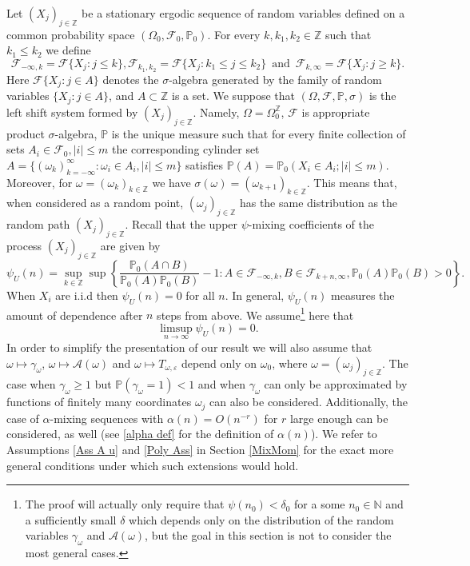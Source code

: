 \documentclass[11pt,reqno,a4paper]{article}
\theoremstyle{special}
\def\om{\omega}
\begin{document}
Let $(X_j)_{j\in\mathbb Z}$ be a stationary ergodic sequence of random variables defined on a common probability space $(\Omega_0,\mathcal F_0,\mathbb P_0)$. For every $k,k_1,k_2\in\mathbb Z$ such that $k_1\leq k_2$ we define 
$$
\mathcal F_{-\infty,k}=\mathcal F\{X_j: j\leq k\},
\mathcal F_{k_1,k_2}=\mathcal F\{X_j:  k_1\leq j\leq k_2\}\,\text{ and }\, 
\mathcal F_{k,\infty}=\mathcal F\{X_j: j\geq k\}.
$$
Here $\mathcal F\{X_j: j\in A\}$ denotes the $\sigma$-algebra generated by the family of random variables $\{X_j: j\in A\}$, and $A\subset\mathbb Z$ is a set.
We suppose that $(\Omega,\mathcal F,\mathbb P,\sigma)$ is the left shift system formed by   $(X_j)_{j\in\mathbb Z}$. Namely, $\Omega=\Omega_0^\mathbb Z$, $\mathcal F$ is appropriate product $\sigma$-algebra, $\mathbb P$ is the unique measure such that for every finite collection of sets $A_i\in \mathcal F_0, |i|\leq m$ the  corresponding cylinder set
$A=\{(\om_k)_{k=-\infty}^\infty: \om_i\in A_i, |i|\leq m\}$  satisfies $\mathbb P(A)=\mathbb P_0(X_i\in A_i; |i|\leq m)$. Moreover, for $\om=(\om_k)_{k\in\mathbb Z}$ we have  $\sigma(\om)=(\om_{k+1})_{k\in\mathbb Z}$. This means that, when considered as a random point,  $(\om_j)_{j\in\mathbb Z}$ has the same distribution as the random path $(X_j)_{j\in\mathbb Z}$. %
 Recall that the upper   $\psi$-mixing coefficients  of the process $(X_j)_{j\in\mathbb Z}$ are given by 
$$
\psi_U(n)=\sup_{k\in\mathbb Z}\sup\left\{\frac{\mathbb P_0(A\cap B)}
{\mathbb P_0(A)\mathbb P_0(B)}-1:A\in\mathcal F_{-\infty,k}, 
B\in\mathcal F_{k+n,\infty}, \mathbb P_0(A)\mathbb P_0(B)>0\right\}.
$$
When $X_i$ are i.i.d then $\psi_U(n)=0$ for all $n$. In general,  $\psi_U(n)$ measures the amount of dependence after $n$ steps from above. 
We assume\footnote{The proof will actually only require that $\psi(n_0)<\delta_0$ for a some $n_0\in\mathbb N$ and a  sufficiently small $\delta$ which depends only on the distribution of the random variables $\gamma_\om$ and $\mathcal A(\om)$, but the goal in this section is not to consider the most general cases.} here that
\begin{equation}\label{psi cond}
\limsup_{n\to\infty}\psi_U(n)=0.    
\end{equation}
 In order to simplify the presentation of our result we will also assume that $\om\mapsto \gamma_\om$, $\omega\mapsto \mathcal A(\om)$ and $\om\mapsto T_{\om,\varepsilon}$ depend only on  $\om_0$, where $\om=(\om_j)_{j\in\mathbb Z}$. The case when $\gamma_\om\geq 1$ but $\mathbb P(\gamma_\om=1)<1$ and when $\gamma_\om$ can only be approximated by functions of finitely many coordinates $\om_j$ can also be considered. Additionally, the case of  $\alpha$-mixing sequences with  $\alpha(n)=O(n^{-r})$ for $r$ large enough can be considered, as well (see \eqref{alpha def} for the definition of $\alpha(n)$).  We refer to Assumptions \ref{Ass A u} and \ref{Poly Ass} in Section \ref{MixMom} for the exact more general conditions under which such extensions would hold.
 
\end{document}
